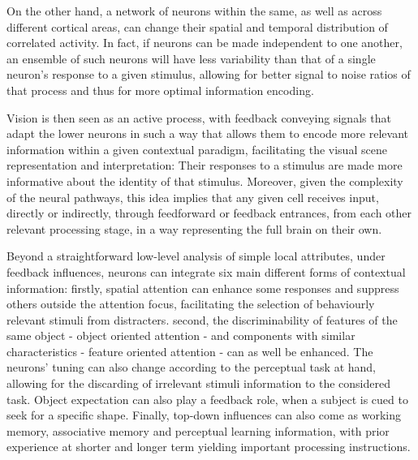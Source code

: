 On the other hand, a network of neurons within the same, as well as across different cortical areas, can change their spatial and temporal distribution of correlated activity. In fact, if neurons can be made independent to one another, an ensemble of such neurons will have less variability than that of a single neuron's response to a given stimulus, allowing for better signal to noise ratios of that process and thus for more optimal information encoding.

Vision is then seen as an active process, with feedback conveying signals that adapt the lower neurons in such a way that allows them to encode more relevant information within a given contextual paradigm, facilitating the visual scene representation and interpretation: Their responses to a stimulus are made more informative about the identity of that stimulus. Moreover, given the complexity of the neural pathways, this idea implies that any given cell receives input, directly or indirectly, through feedforward or feedback entrances, from each other relevant processing stage, in a way representing the full brain on their own.


Beyond a straightforward low-level analysis of simple local attributes, under feedback influences, neurons can integrate six main different forms of contextual information: firstly, spatial attention can enhance some responses and suppress others outside the attention focus, facilitating the selection of behaviourly relevant stimuli from distracters. second, the discriminability of features of the same object - object oriented attention - and components with similar characteristics - feature oriented attention - can as well be enhanced. The neurons' tuning can also change according to the perceptual task at hand, allowing for the discarding of irrelevant stimuli information to the considered task. Object expectation can also play a feedback role, when a subject is cued to seek for a specific shape.  Finally, top-down influences can also come as working memory, associative memory and perceptual learning information, with prior experience at shorter and longer term yielding important processing instructions. 

